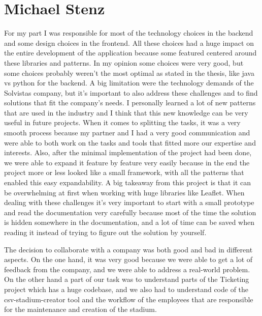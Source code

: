 \section{Michael Stenz}
For my part I was responsible for most of the technology choices in the backend and some design choices in the frontend. All these choices had a huge impact on the entire development of the application because some featured centered around these libraries and patterns. In my opinion some choices were very good, but some choices probably weren't the most optimal as stated in the thesis, like java vs python for the backend. A big limitation were the technology demands of the Solvistas company, but it's important to also address these challenges and to find solutions that fit the company's needs. I personally learned a lot of new patterns that are used in the industry and I think that this new knowledge can be very useful in future projects. When it comes to splitting the tasks, it was a very smooth process because my partner and I had a very good communication and were able to both work on the tasks and tools that fitted more our expertise and interests. Also, after the minimal implementation of the project had been done, we were able to expand it feature by feature very easily because in the end the project more or less looked like a small framework, with all the patterns that enabled this easy expandability. A big takeaway from this project is that it can be overwhelming at first when working with huge libraries like Leaflet. When dealing with these challenges it's very important to start with a small prototype and read the documentation very carefully because most of the time the solution is hidden somewhere in the documentation, and a lot of time can be saved when reading it instead of trying to figure out the solution by yourself.

The decision to collaborate with a company was both good and bad in different aspects. On the one hand, it was very good because we were able to get a lot of feedback from the company, and we were able to address a real-world problem. On the other hand a part of our task was to understand parts of the Ticketing project which has a huge codebase, and we also had to understand code of the csv-stadium-creator tool and the workflow of the employees that are responsible for the maintenance and creation of the stadium.